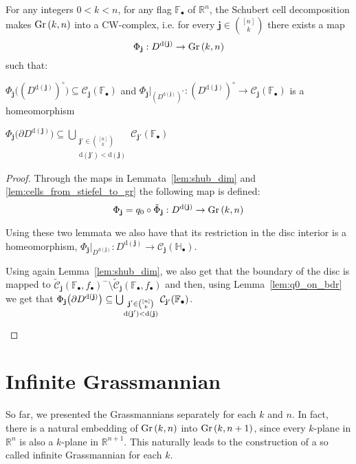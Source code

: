 \begin{theorem}\label{thm:cw_complex} For any integers $0<k<n$, for any flag $\mathbb{F}_{\bullet}$ of $\mathbb{R}^n$, the Schubert cell decomposition makes $\Gr{k}{n}$ into a CW-complex, i.e. for every $\mathbf{j}\in\binom{[n]}{k}$ there exists a map
\[\Phi_{\mathbf{j}}:D^{\mathrm{d}(\mathbf{j})}\to\Gr{k}{n}\]
such that:
\begin{i_enum} \item $\Phi_{\mathbf{j}}\big({\left(D^{\mathrm{d}(\mathbf{j})}\right)}^{\circ}\big)\subseteq\mathcal{C}_{\mathbf{j}}(\mathbb{F}_{\bullet})$ and $\Phi_{\mathbf{j}}|_{{\left(D^{\mathrm{d}(\mathbf{j})}\right)}^{\circ}}:{\left(D^{\mathrm{d}(\mathbf{j})}\right)}^{\circ}\to\mathcal{C}_{\mathbf{j}}(\mathbb{F}_{\bullet})$ is a homeomorphism
\item $\Phi_{\mathbf{j}}\big({\partial D^{\mathrm{d}(\mathbf{j})}}\big)\subseteq\bigcup_{\substack{\mathbf{j}'\in\binom{[n]}{k}\\\mathrm{d}(\mathbf{j}')<\mathrm{d}(\mathbf{j})}}\mathcal{C}_{\mathbf{j}'}(\mathbb{F}_{\bullet})$
\end{i_enum}
\end{theorem}
\begin{proof} Through the maps in Lemmata~\ref{lem:shub_dim} and \ref{lem:cells_from_stiefel_to_gr} the following map is defined:
\[\Phi_{\mathbf{j}}=q_0\circ\tilde{\Phi}_{\mathbf{j}}:D^{\mathrm{d}(\mathbf{j})}\to\Gr{k}{n}\]
\begin{i_enum}
\item Using these two lemmata we also have that its restriction in the disc interior is a homeomorphism,
$\Phi_{\mathbf{j}}|_{D^{\mathrm{d}(\mathbf{j})}}:D^{\mathrm{d}(\mathbf{j})}\to\mathcal{C}_{\mathbf{j}}(\mathbb{H}_{\bullet})$.
\item Using again Lemma~\ref{lem:shub_dim}, we also get that the boundary of the disc is mapped to $\tilde{\mathcal{C}}_{\mathbf{j}}(\mathbb{F}_{\bullet},f_{\bullet})^-\setminus\tilde{\mathcal{C}}_{\mathbf{j}}(\mathbb{F}_{\bullet},f_{\bullet})$ and then, using Lemma~\ref{lem:q0_on_bdr} we get that
$\Phi_{\mathbf{j}}\big({\partial D^{\mathrm{d}(\mathbf{j})}}\big)\subseteq\bigcup_{\substack{\mathbf{j}'\in\binom{[n]}{k}\\\mathrm{d}(\mathbf{j}')<\mathrm{d}(\mathbf{j})}}\mathcal{C}_{\mathbf{j}'}(\mathbb{F}_{\bullet})\qedhere$.
\end{i_enum}
\end{proof}

\section{Infinite Grassmannian}
So far, we presented the Grassmannians separately for each $k$ and $n$. In fact, there is a natural embedding of $\Gr{k}{n}$ into $\Gr{k}{n+1}$, since every $k$-plane in $\mathbb{R}^n$ is also a $k$-plane in $\mathbb{R}^{n+1}$. This naturally leads to the construction of a so called infinite Grassmannian for each $k$.


